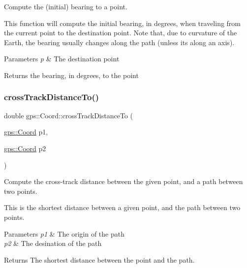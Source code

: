 Compute the (initial) bearing to a point.

This function will compute the initial bearing, in degrees, when traveling from the current point to the destination point. Note that, due to curvature of the Earth, the bearing usually changes along the path (unless its along an axis).


\begin{DoxyParams}{Parameters}
{\em p} & The destination point \\
\hline
\end{DoxyParams}
\begin{DoxyReturn}{Returns}
the bearing, in degrees, to the point 
\end{DoxyReturn}
\mbox{\label{classgps_1_1Coord_a0efb59b2c1fa68551f118bcea3733593}} 
\subsubsection{\texorpdfstring{cross\+Track\+Distance\+To()}{crossTrackDistanceTo()}}
{\footnotesize\ttfamily double gps\+::\+Coord\+::cross\+Track\+Distance\+To (\begin{DoxyParamCaption}\item[{\hyperlink{classgps_1_1Coord}{gps\+::\+Coord}}]{p1,  }\item[{\hyperlink{classgps_1_1Coord}{gps\+::\+Coord}}]{p2 }\end{DoxyParamCaption})}

Compute the cross-\/track distance between the given point, and a path between two points.

This is the shortest distance between a given point, and the path between two points.


\begin{DoxyParams}{Parameters}
{\em p1} & The origin of the path \\
\hline
{\em p2} & The desination of the path \\
\hline
\end{DoxyParams}
\begin{DoxyReturn}{Returns}
The shortest distance between the point and the path. 
\end{DoxyReturn}
\mbox{\label{classgps_1_1Coord_ae76a605c81049d648d4e39ee0f56ff7b}} 
